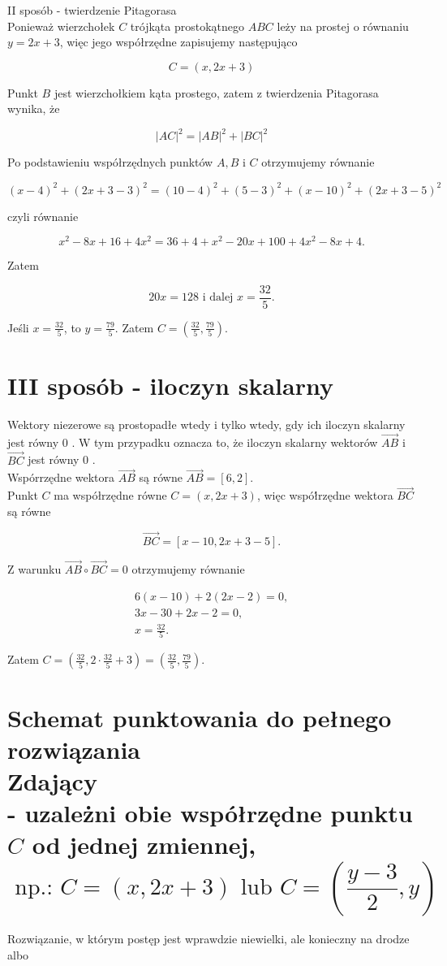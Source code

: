 \documentclass[10pt]{article}
\begin{document}
II sposób - twierdzenie Pitagorasa\\
Ponieważ wierzchołek $C$ trójkąta prostokątnego $A B C$ leży na prostej o równaniu $y=2 x+3$, więc jego współrzędne zapisujemy następująco

$$
C=(x, 2 x+3)
$$

Punkt $B$ jest wierzchołkiem kąta prostego, zatem z twierdzenia Pitagorasa wynika, że

$$
|A C|^{2}=|A B|^{2}+|B C|^{2}
$$

Po podstawieniu współrzędnych punktów $A, B$ i $C$ otrzymujemy równanie

$$
(x-4)^{2}+(2 x+3-3)^{2}=(10-4)^{2}+(5-3)^{2}+(x-10)^{2}+(2 x+3-5)^{2}
$$

czyli równanie

$$
x^{2}-8 x+16+4 x^{2}=36+4+x^{2}-20 x+100+4 x^{2}-8 x+4 .
$$

Zatem

$$
20 x=128 \text { i dalej } x=\frac{32}{5} .
$$

Jeśli $x=\frac{32}{5}$, to $y=\frac{79}{5}$. Zatem $C=\left(\frac{32}{5}, \frac{79}{5}\right)$.

\section*{III sposób - iloczyn skalarny}
Wektory niezerowe są prostopadłe wtedy i tylko wtedy, gdy ich iloczyn skalarny jest równy 0 . W tym przypadku oznacza to, że iloczyn skalarny wektorów $\overrightarrow{A B}$ i $\overrightarrow{B C}$ jest równy 0 .\\
Wspórrzędne wektora $\overrightarrow{A B}$ są równe $\overrightarrow{A B}=[6,2]$.\\
Punkt $C$ ma współrzędne równe $C=(x, 2 x+3)$, więc współ́rzędne wektora $\overrightarrow{B C}$ są równe

$$
\overrightarrow{B C}=[x-10,2 x+3-5] .
$$

Z warunku $\overrightarrow{A B} \circ \overrightarrow{B C}=0$ otrzymujemy równanie

$$
\begin{gathered}
6(x-10)+2(2 x-2)=0, \\
3 x-30+2 x-2=0, \\
x=\frac{32}{5} .
\end{gathered}
$$

Zatem $C=\left(\frac{32}{5}, 2 \cdot \frac{32}{5}+3\right)=\left(\frac{32}{5}, \frac{79}{5}\right)$.

\section*{Schemat punktowania do pełnego rozwiązania \\
 Zdający \\
 - uzależni obie współrzędne punktu $C$ od jednej zmiennej, \\
 $$ \text { np.: } C=(x, 2 x+3) \text { lub } C=\left(\frac{y-3}{2}, y\right) $$}
Rozwiązanie, w którym postęp jest wprawdzie niewielki, ale konieczny na drodze\\
albo
\end{document}
